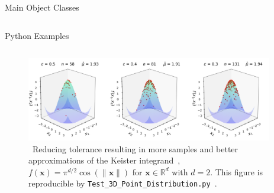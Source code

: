 \documentclass[final]{beamer}
\newlength{\onecolwid}
\newlength{\twocolwid}
\newlength{\threecolwid}
\newcommand{\bvec}[1]{\boldsymbol{#1}}
\newcommand{\vx}{\bvec{x}}
\begin{document}
\begin{frame}[t]
\begin{columns}[t]
\begin{column}{\threecolwid}
\begin{columns}[t,totalwidth=\threecolwid]
\begin{column}{\twocolwid}
\begin{block}{Main Object Classes}
\end{block}
\end{column}

\end{columns} 

\begin{column}{\threecolwid}\vspace{-.8in}
\begin{block}{Python Examples}

    \begin{column}{\onecolwid}
        
    \end{column}
    \begin{column}{\twocolwid}
    \vspace{-2ex}
        \begin{figure}
            \includegraphics[width=0.96\textwidth]{Images/Three_3d_SurfaceScatters.png}         
            \caption{\ Reducing tolerance resulting in more samples and better approximations of the Keister integrand~\cite{keister1996multidimensional}, $f(\vx) = \pi^{d/2} \cos(\lVert \vx \rVert)$ for $\vx \in  \mathbb{R}^d$ with $d=2$. This figure is reproducible by \texttt{Test\_3D\_Point\_Distribution.py}~\cite{HicEtal19}.}
        \end{figure} 
    \end{column}
    
\end{block}
\end{column}

\end{column}


\end{columns}
\end{frame}
\end{document}
